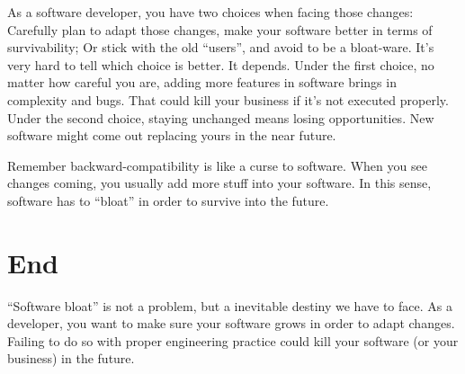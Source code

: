 \documentclass[a4paper, 11pt]{article}
\begin{document}
As a software developer, you have two choices when facing those
changes: Carefully plan to adapt those changes, make your software
better in terms of survivability; Or stick with the old ``users'', and
avoid to be a bloat-ware. It's very hard to tell which choice is
better. It depends. Under the first choice, no matter how careful you
are, adding more features in software brings in complexity and
bugs. That could kill your business if it's not executed
properly. Under the second choice, staying unchanged means losing
opportunities. New software might come out replacing yours in the near
future.

Remember backward-compatibility is like a curse to software. When you
see changes coming, you usually add more stuff into your software. In
this sense, software has to ``bloat'' in order to survive into the
future.

\section*{End}

``Software bloat'' is not a problem, but a inevitable destiny we have
to face. As a developer, you want to make sure your software grows in
order to adapt changes. Failing to do so with proper engineering
practice could kill your software (or your business) in the future.
\end{document}
